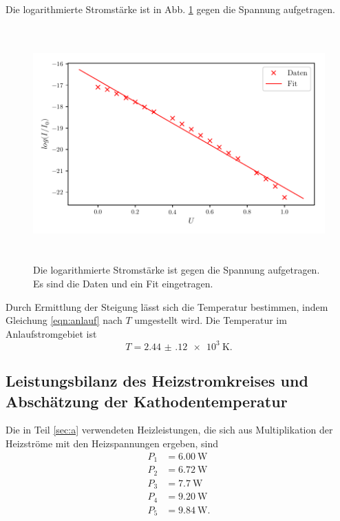



\noindent Die logarithmierte Stromstärke ist in Abb. \ref{fig:plot3}
gegen die Spannung aufgetragen.
\begin{figure}
    \centering
    \includegraphics[width=15cm, height=9cm]{build/plot3.pdf}
    \caption{Die logarithmierte Stromstärke ist gegen die Spannung aufgetragen.
    Es sind die Daten und ein Fit eingetragen.}
    \label{fig:plot3}
\end{figure}

\noindent Durch Ermittlung der Steigung lässt sich
die Temperatur bestimmen, indem Gleichung \eqref{eqn:anlauf}
nach $T$ umgestellt wird. 
Die Temperatur im Anlaufstromgebiet ist
\begin{equation*}
    T = \SI{2.44(12)e3}{\kelvin}.
\end{equation*}


\subsection{Leistungsbilanz des Heizstromkreises und Abschätzung der Kathodentemperatur}
Die in Teil \ref{sec:a} verwendeten Heizleistungen, die sich 
aus Multiplikation der Heizströme mit den Heizspannungen
ergeben, sind
\begin{align*}
    P_\text{1} &= \SI{6.00}{\watt} \\
    P_\text{2} &= \SI{6.72}{\watt} \\
    P_\text{3} &= \SI{7.7}{\watt} \\
    P_\text{4} &= \SI{9.20}{\watt} \\
    P_\text{5} &= \SI{9.84}{\watt}.
\end{align*}  %

